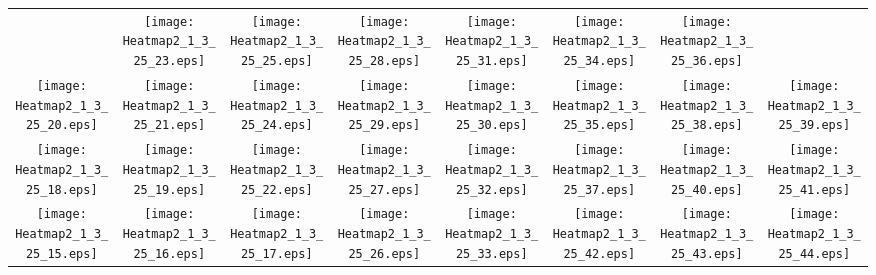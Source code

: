 \documentclass{standalone}
\begin{document}
\renewcommand{\arraystretch}{0}
\setlength{\tabcolsep}{0pt}
\begin{tabular}{ *8{c} }
 & \texttt{[image: Heatmap2\_1\_3\_25\_23.eps]} & \texttt{[image: Heatmap2\_1\_3\_25\_25.eps]} & \texttt{[image: Heatmap2\_1\_3\_25\_28.eps]} & \texttt{[image: Heatmap2\_1\_3\_25\_31.eps]} & \texttt{[image: Heatmap2\_1\_3\_25\_34.eps]} & \texttt{[image: Heatmap2\_1\_3\_25\_36.eps]} &  \\
\texttt{[image: Heatmap2\_1\_3\_25\_20.eps]} & \texttt{[image: Heatmap2\_1\_3\_25\_21.eps]} & \texttt{[image: Heatmap2\_1\_3\_25\_24.eps]} & \texttt{[image: Heatmap2\_1\_3\_25\_29.eps]} & \texttt{[image: Heatmap2\_1\_3\_25\_30.eps]} & \texttt{[image: Heatmap2\_1\_3\_25\_35.eps]} & \texttt{[image: Heatmap2\_1\_3\_25\_38.eps]} & \texttt{[image: Heatmap2\_1\_3\_25\_39.eps]} \\
\texttt{[image: Heatmap2\_1\_3\_25\_18.eps]} & \texttt{[image: Heatmap2\_1\_3\_25\_19.eps]} & \texttt{[image: Heatmap2\_1\_3\_25\_22.eps]} & \texttt{[image: Heatmap2\_1\_3\_25\_27.eps]} & \texttt{[image: Heatmap2\_1\_3\_25\_32.eps]} & \texttt{[image: Heatmap2\_1\_3\_25\_37.eps]} & \texttt{[image: Heatmap2\_1\_3\_25\_40.eps]} & \texttt{[image: Heatmap2\_1\_3\_25\_41.eps]} \\
\texttt{[image: Heatmap2\_1\_3\_25\_15.eps]} & \texttt{[image: Heatmap2\_1\_3\_25\_16.eps]} & \texttt{[image: Heatmap2\_1\_3\_25\_17.eps]} & \texttt{[image: Heatmap2\_1\_3\_25\_26.eps]} & \texttt{[image: Heatmap2\_1\_3\_25\_33.eps]} & \texttt{[image: Heatmap2\_1\_3\_25\_42.eps]} & \texttt{[image: Heatmap2\_1\_3\_25\_43.eps]} & \texttt{[image: Heatmap2\_1\_3\_25\_44.eps]} \\

\end{tabular}
\end{document}
